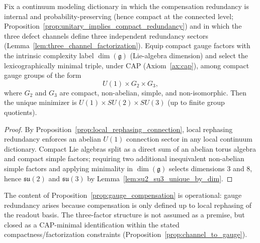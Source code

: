 \begin{proposition}\label{prop:channel_to_gauge}
Fix a continuum modeling dictionary in which the compensation redundancy is internal and probability-preserving (hence compact at the connected level; Proposition~\ref{prop:unitary_implies_compact_redundancy}) and in which the three defect channels define three independent redundancy sectors (Lemma~\ref{lem:three_channel_factorization}).
Equip compact gauge factors with the intrinsic complexity label $\dim(\mathfrak{g})$ (Lie-algebra dimension) and select the lexicographically minimal triple, under CAP (Axiom~\ref{ax:cap}), among compact gauge groups of the form
\[
U(1)\times G_2\times G_3,
\]
where $G_2$ and $G_3$ are compact, non-abelian, simple, and non-isomorphic.
Then the unique minimizer is $U(1)\times SU(2)\times SU(3)$ (up to finite group quotients).
\end{proposition}
\begin{proof}
By Proposition~\ref{prop:local_rephasing_connection}, local rephasing redundancy enforces an abelian $U(1)$ connection sector in any local continuum dictionary.
Compact Lie algebras split as a direct sum of an abelian torus algebra and compact simple factors; requiring two additional inequivalent non-abelian simple factors and applying minimality in $\dim(\mathfrak{g})$ selects dimensions $3$ and $8$, hence $\mathfrak{su}(2)$ and $\mathfrak{su}(3)$ by Lemma~\ref{lem:su2_su3_unique_by_dim}.
\end{proof}

The content of Proposition~\ref{prop:gauge_compensation} is operational: gauge redundancy arises because compensation is only defined up to local rephasing of the readout basis.
The three-factor structure is not assumed as a premise, but closed as a CAP-minimal identification within the stated compactness/factorization constraints (Proposition~\ref{prop:channel_to_gauge}).

